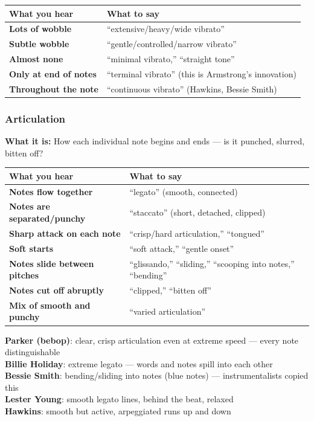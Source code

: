 \documentclass[11pt,letterpaper]{article}
\begin{document}
\begin{small}
\begin{tabularx}{\textwidth}{>{\bfseries}p{3cm} X}
\toprule
\textbf{What you hear} & \textbf{What to say} \\
\midrule
Lots of wobble & ``extensive/heavy/wide vibrato'' \\
Subtle wobble & ``gentle/controlled/narrow vibrato'' \\
Almost none & ``minimal vibrato,'' ``straight tone'' \\
Only at end of notes & ``terminal vibrato'' (this is Armstrong's innovation) \\
Throughout the note & ``continuous vibrato'' (Hawkins, Bessie Smith) \\
\bottomrule
\end{tabularx}
\end{small}

\subsubsection{Articulation}
\textbf{What it is:} How each individual note begins and ends --- is it punched, slurred, bitten off?

\begin{small}
\begin{tabularx}{\textwidth}{>{\bfseries}p{3cm} X}
\toprule
\textbf{What you hear} & \textbf{What to say} \\
\midrule
Notes flow together & ``legato'' (smooth, connected) \\
Notes are separated/punchy & ``staccato'' (short, detached, clipped) \\
Sharp attack on each note & ``crisp/hard articulation,'' ``tongued'' \\
Soft starts & ``soft attack,'' ``gentle onset'' \\
Notes slide between pitches & ``glissando,'' ``sliding,'' ``scooping into notes,'' ``bending'' \\
Notes cut off abruptly & ``clipped,'' ``bitten off'' \\
Mix of smooth and punchy & ``varied articulation'' \\
\bottomrule
\end{tabularx}
\end{small}

\begin{tcolorbox}[examplebox, title={Key distinctions from class}]
\textbf{Parker (bebop)}: clear, crisp articulation even at extreme speed --- every note distinguishable\\
\textbf{Billie Holiday}: extreme legato --- words and notes spill into each other\\
\textbf{Bessie Smith}: bending/sliding into notes (blue notes) --- instrumentalists copied this\\
\textbf{Lester Young}: smooth legato lines, behind the beat, relaxed\\
\textbf{Hawkins}: smooth but active, arpeggiated runs up and down
\end{tcolorbox}
\end{document}
